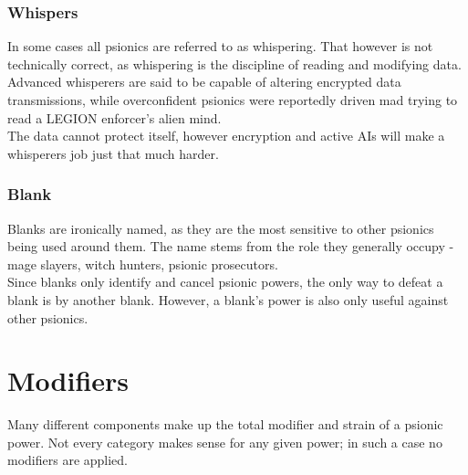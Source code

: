 \documentclass[12pt,a4paper,openany]{book}
\begin{document}
	\subsubsection*{Whispers}
	In some cases all psionics are referred to as whispering. That however is not technically correct, as whispering is the discipline of reading and modifying data. Advanced whisperers are said to be capable of altering encrypted data transmissions, while overconfident psionics were reportedly driven mad trying to read a LEGION enforcer's alien mind.\\
	The data cannot protect itself, however encryption and active AIs will make a whisperers job just that much harder.
	\subsubsection*{Blank}
	Blanks are ironically named, as they are the most sensitive to other psionics being used around them. The name stems from the role they generally occupy - mage slayers, witch hunters, psionic prosecutors.\\
	Since blanks only identify and cancel psionic powers, the only way to defeat a blank is by another blank. However, a blank's power is also only useful against other psionics.
	\section{Modifiers}
	Many different components make up the total modifier and strain of a psionic power. Not every category makes sense for any given power; in such a case no modifiers are applied.
\end{document}
